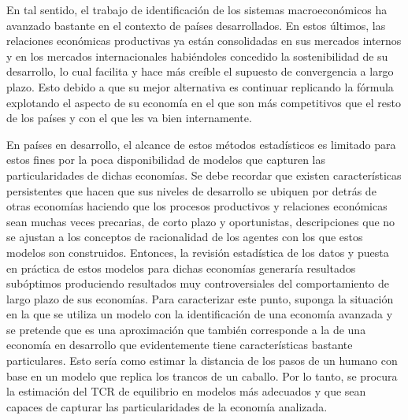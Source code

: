 \documentclass[12pt,letterpaper]{article}
\begin{document}
En tal sentido, el trabajo de identificación de los sistemas macroeconómicos ha avanzado bastante en el contexto de países desarrollados. En estos últimos, las relaciones económicas productivas ya están consolidadas en sus mercados internos y en los mercados internacionales habiéndoles concedido la sostenibilidad de su desarrollo, lo cual facilita y hace más creíble el supuesto de convergencia a largo plazo. Esto debido a que su mejor alternativa es continuar replicando la fórmula explotando el aspecto de su economía en el que son más competitivos que el resto de los países y con el que les va bien internamente. 

En países en desarrollo, el alcance de estos métodos estadísticos es limitado para estos fines por la poca disponibilidad de modelos que capturen las particularidades de dichas economías. Se debe recordar que existen características persistentes que hacen que sus niveles de desarrollo se ubiquen por detrás de otras economías haciendo que los procesos productivos y relaciones económicas sean muchas veces precarias, de corto plazo y oportunistas, descripciones que no se ajustan a los conceptos de racionalidad de los agentes con los que estos modelos son construidos. Entonces, la revisión estadística de los datos y puesta en práctica de estos modelos para dichas economías generaría resultados subóptimos produciendo resultados muy controversiales del comportamiento de largo plazo de sus economías. Para caracterizar este punto, suponga la situación en la que se utiliza un modelo con la identificación de una economía avanzada y se pretende que es una aproximación que también corresponde a la de una economía en desarrollo que evidentemente tiene características bastante particulares. Esto sería como estimar la distancia de los pasos de un humano con base en un modelo que replica los trancos de un caballo. Por lo tanto, se procura la estimación del TCR de equilibrio en modelos más adecuados y que sean capaces de capturar las particularidades de la economía analizada.
\end{document}
